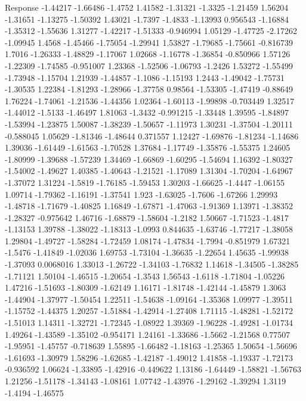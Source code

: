 \documentclass[9pt]{article}
\theoremstyle{plain}
\theoremstyle{definition}
\theoremstyle{remark}
\numberwithin{equation}{section}
\begin{document}
Response
-1.44217
-1.66486
-1.4752
1.41582
-1.31321
-1.3325
-1.21459
1.56204
-1.31651
-1.13275
-1.50392
1.43021
-1.7397
-1.4833
-1.13993
0.956543
-1.16884
-1.35312
-1.55636
1.31277
-1.42217
-1.51333
-0.946994
1.05129
-1.47725
-2.17262
-1.09945
1.4568
-1.45466
-1.75054
-1.29941
1.53827
-1.79685
-1.75661
-0.816739
1.7016
-1.26333
-1.48829
-1.17067
1.02668
-1.16778
-1.36854
-0.850966
1.57126
-1.22309
-1.74585
-0.951007
1.23368
-1.52506
-1.06793
-1.2426
1.53272
-1.55499
-1.73948
-1.15704
1.21939
-1.44857
-1.1086
-1.15193
1.2443
-1.49042
-1.75731
-1.30535
1.22384
-1.81293
-1.28966
-1.37758
0.98564
-1.53305
-1.47419
-0.88649
1.76224
-1.74061
-1.21536
-1.44356
1.02364
-1.60113
-1.99898
-0.703449
1.32517
-1.44012
-1.5133
-1.46497
1.81063
-1.3432
-0.991215
-1.33448
1.39595
-1.84897
-1.53994
-1.23875
1.50087
-1.38239
-1.50657
-1.11973
1.30231
-1.37504
-1.20111
-0.588045
1.05629
-1.81346
-1.48644
0.371557
1.12427
-1.69876
-1.81234
-1.14686
1.39036
-1.61449
-1.61563
-1.70528
1.37684
-1.17749
-1.35876
-1.55375
1.24605
-1.80999
-1.39688
-1.57239
1.34469
-1.66869
-1.60295
-1.54694
1.16392
-1.80327
-1.54002
-1.49627
1.40385
-1.40643
-1.21521
-1.17089
1.31304
-1.70204
-1.64967
-1.37072
1.31224
-1.5819
-1.76185
-1.59453
1.30203
-1.66625
-1.4447
-1.06155
1.09714
-1.79362
-1.16191
-1.37541
1.923
-1.63025
-1.7606
-1.67266
1.29993
-1.48718
-1.71679
-1.40825
1.16849
-1.67871
-1.47063
-1.91369
1.13971
-1.38352
-1.28327
-0.975642
1.46716
-1.68879
-1.58604
-1.2182
1.50667
-1.71523
-1.4817
-1.13153
1.39788
-1.38022
-1.18313
-1.0993
0.844635
-1.63746
-1.77217
-1.38058
1.29804
-1.49727
-1.58284
-1.72459
1.08174
-1.47834
-1.7994
-0.851979
1.67321
-1.5476
-1.41849
-1.02036
1.69753
-1.73104
-1.36635
-1.22654
1.45635
-1.99938
-1.37093
0.0068016
1.33013
-1.26722
-1.34103
-1.76832
1.14618
-1.34505
-1.38285
-1.71121
1.50104
-1.46515
-1.20654
-1.3543
1.56543
-1.6118
-1.71804
-1.05226
1.47216
-1.51693
-1.80309
-1.62149
1.16171
-1.81748
-1.42144
-1.45879
1.3063
-1.44904
-1.37977
-1.50454
1.22511
-1.54638
-1.09164
-1.35368
1.09977
-1.39511
-1.15752
-1.44375
1.20257
-1.51884
-1.42914
-1.27408
1.71115
-1.48281
-1.52172
-1.51013
1.14311
-1.32721
-1.72345
-1.08922
1.39369
-1.96228
-1.49281
-1.01734
1.49264
-1.43589
-1.35102
-0.954171
1.24161
-1.33686
-1.5662
-1.21568
0.77507
-1.95951
-1.45757
-0.718639
1.55895
-1.66482
-1.18163
-1.25365
1.50654
-1.56696
-1.61693
-1.30979
1.58296
-1.62685
-1.42187
-1.49012
1.41858
-1.19337
-1.72173
-0.936592
1.06624
-1.33895
-1.42916
-0.449622
1.13186
-1.64449
-1.58821
-1.56763
1.21256
-1.51178
-1.34143
-1.08161
1.07742
-1.43976
-1.29162
-1.39294
1.3119
-1.4194
-1.46575
\end{document}
